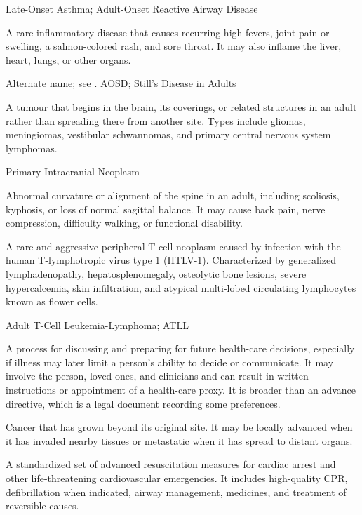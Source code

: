 \synonyms
Late-Onset Asthma; Adult-Onset Reactive Airway Disease

 A rare inflammatory disease that causes recurring high fevers, joint pain or swelling, a salmon-colored rash, and sore throat. It may also inflame the liver, heart, lungs, or other organs.

 Alternate name; see .
\synonyms
AOSD; Still's Disease in Adults

 A tumour that begins in the brain, its coverings, or related structures in an adult rather than spreading there from another site. Types include gliomas, meningiomas, vestibular schwannomas, and primary central nervous system lymphomas.

\synonyms
Primary Intracranial Neoplasm

 Abnormal curvature or alignment of the spine in an adult, including scoliosis, kyphosis, or loss of
normal sagittal balance. It may cause back pain, nerve compression, difficulty walking,
or functional disability.

 A rare and aggressive peripheral T-cell neoplasm caused by infection with the human T-lymphotropic virus type 1 (HTLV-1). Characterized by generalized lymphadenopathy, hepatosplenomegaly, osteolytic bone lesions, severe hypercalcemia, skin infiltration, and atypical multi-lobed circulating lymphocytes known as flower cells.

\synonyms
Adult T-Cell Leukemia-Lymphoma; ATLL

 A process for discussing and preparing for future health-care decisions, especially if illness may later limit a person's
ability to decide or communicate. It may involve the person, loved ones, and clinicians and can result in written instructions or
appointment of a health-care proxy. It is broader than an advance directive, which is a legal document recording some preferences.

 Cancer that has grown beyond its original site. It may be locally advanced when it has
invaded nearby tissues or metastatic when it has spread to distant organs.

 A standardized set of advanced resuscitation measures for cardiac arrest and other
life-threatening cardiovascular emergencies. It includes high-quality CPR, defibrillation
when indicated, airway management, medicines, and treatment of reversible causes.

